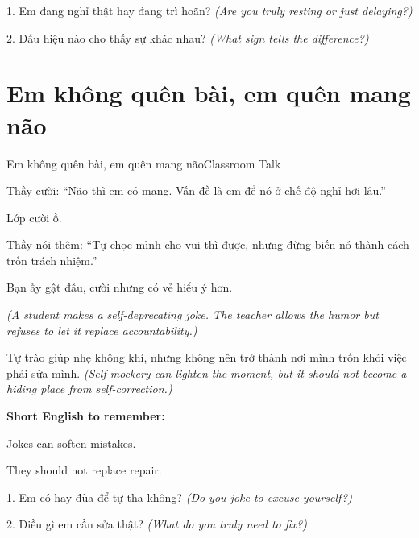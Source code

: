 \begin{tuhocnhanh}
1. Em đang nghỉ thật hay đang trì hoãn? \textit{(Are you truly resting or just delaying?)}

2. Dấu hiệu nào cho thấy sự khác nhau? \textit{(What sign tells the difference?)}
\end{tuhocnhanh}
\ngancach

\section{Em không quên bài, em quên mang não}
\begin{truyen}{Em không quên bài, em quên mang não}{Classroom Talk}

Thầy cười: ``Não thì em có mang. Vấn đề là em để nó ở chế độ nghỉ hơi lâu.''

Lớp cười ồ.

Thầy nói thêm: ``Tự chọc mình cho vui thì được, nhưng đừng biến nó thành cách trốn trách nhiệm.''

Bạn ấy gật đầu, cười nhưng có vẻ hiểu ý hơn.

\textit{(A student makes a self-deprecating joke. The teacher allows the humor but refuses to let it replace accountability.)}
\end{truyen}

\begin{baihoc}
Tự trào giúp nhẹ không khí, nhưng không nên trở thành nơi mình trốn khỏi việc phải sửa mình.
\textit{(Self-mockery can lighten the moment, but it should not become a hiding place from self-correction.)}
\end{baihoc}

\begin{ghinhoanh}
\textbf{Short English to remember:}

Jokes can soften mistakes.

They should not replace repair.
\end{ghinhoanh}

\begin{tuhocnhanh}
1. Em có hay đùa để tự tha không? \textit{(Do you joke to excuse yourself?)}

2. Điều gì em cần sửa thật? \textit{(What do you truly need to fix?)}
\end{tuhocnhanh}
\ngancach


